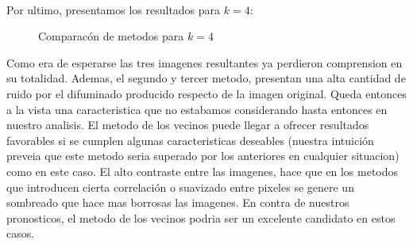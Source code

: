 \\
Por ultimo, presentamos los resultados para $k=4$:

\begin{figure}[H]
    \centering
    \qquad
    \qquad
    \caption{Comparacón de metodos para $k = 4$}%
    \label{fig:example}%
\end{figure}

Como era de esperarse las tres imagenes resultantes ya perdieron comprension en su totalidad. Ademas, el segundo y tercer metodo, presentan una alta cantidad de ruido por el difuminado producido respecto de la imagen original.
Queda entonces a la vista una caracteristica que no estabamos considerando hasta entonces en nuestro analisis. El metodo de los vecinos puede llegar a ofrecer resultados favorables si se cumplen algunas caracteristicas deseables (nuestra intuición preveia que este metodo seria superado por los anteriores en cualquier situacion) como en este caso. El alto contraste entre las imagenes, hace que en los metodos que introducen cierta correlación o suavizado entre pixeles se genere un sombreado que hace mas borrosas las imagenes. En contra de nuestros pronosticos, el metodo de los vecinos podria ser un excelente candidato en estos casos.


